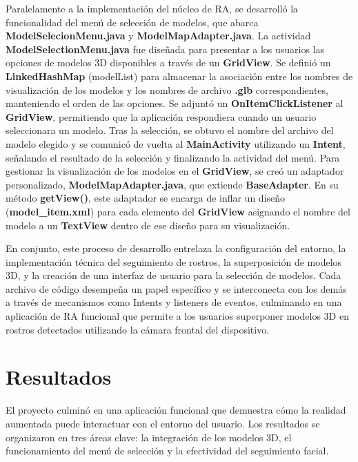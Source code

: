 \documentclass[conference]{IEEEtran}
\begin{document}
        Paralelamente a la implementación del núcleo de RA, se desarrolló la funcionalidad del menú de selección de modelos, que abarca \textbf{ModelSelecionMenu.java} y \textbf{ModelMapAdapter.java}. La actividad \textbf{ModelSelectionMenu.java} fue diseñada para presentar a los usuarios las opciones de modelos 3D disponibles a través de un \textbf{GridView}. Se definió un \textbf{LinkedHashMap} (modelList) para almacenar la asociación entre los nombres de visualización de los modelos y los nombres de archivo \textbf{.glb} correspondientes, manteniendo el orden de las opciones. Se adjuntó un \textbf{OnItemClickListener} al \textbf{GridView}, permitiendo que la aplicación respondiera cuando un usuario seleccionara un modelo. Tras la selección, se obtuvo el nombre del archivo del modelo elegido y se comunicó de vuelta al \textbf{MainActivity} utilizando un \textbf{Intent}, señalando el resultado de la selección y finalizando la actividad del menú. Para gestionar la visualización de los modelos en el \textbf{GridView}, se creó un adaptador personalizado, \textbf{ModelMapAdapter.java}, que extiende \textbf{BaseAdapter}. En su método \textbf{getView()}, este adaptador se encarga de inflar un diseño (\textbf{model\_item.xml}) para cada elemento del \textbf{GridView} asignando el nombre del modelo a un \textbf{TextView} dentro de ese diseño para su visualización. 

        En conjunto, este proceso de desarrollo entrelaza la configuración del entorno, la implementación técnica del seguimiento de rostros, la superposición de modelos 3D, y la creación de una interfaz de usuario para la selección de modelos. Cada archivo de código desempeña un papel específico y se interconecta con los demás a través de mecanismos como Intents y listeners de eventos, culminando en una aplicación de RA funcional que permite a los usuarios superponer modelos 3D en rostros detectados utilizando la cámara frontal del dispositivo.

\section{Resultados} 

    El proyecto culminó en una aplicación funcional que demuestra cómo la realidad aumentada puede interactuar con el entorno del usuario. Los resultados se organizaron en tres áreas clave: la integración de los modelos 3D, el funcionamiento del menú de selección y la efectividad del seguimiento facial.
    
\end{document}
